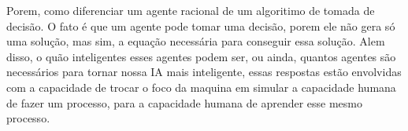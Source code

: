 Porem, como diferenciar um agente racional de um algoritimo de tomada de decisão. O fato é que um agente pode tomar uma decisão, porem ele não gera só uma solução, mas sim, a equação necessária para conseguir essa solução. Alem disso, o quão inteligentes esses agentes podem ser, ou ainda, quantos agentes são necessários para tornar nossa IA mais inteligente, essas respostas estão envolvidas com a capacidade de trocar o foco da maquina em simular a capacidade humana de fazer um processo, para a capacidade humana de aprender esse mesmo processo.